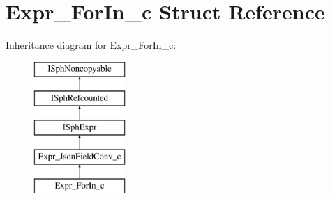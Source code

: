 \hypertarget{structExpr__ForIn__c}{\section{Expr\-\_\-\-For\-In\-\_\-c Struct Reference}
\label{structExpr__ForIn__c}
}
Inheritance diagram for Expr\-\_\-\-For\-In\-\_\-c\-:\begin{figure}[H]
\begin{center}
\leavevmode
\includegraphics[height=5.000000cm]{structExpr__ForIn__c}
\end{center}
\end{figure}
